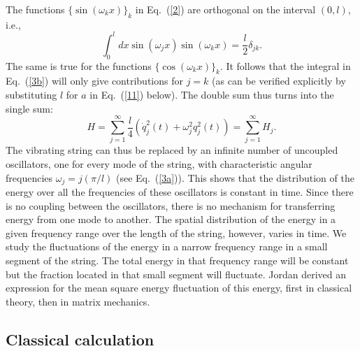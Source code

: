 \documentclass[12pt]{elsart}
\begin{document}
The functions $\{ \sin{(\omega_k x)} \}_k$ in  Eq.\ (\ref{2}) are orthogonal on the interval $(0, l)$, i.e.,
\begin{equation}
\int_0^l dx   \sin{(\omega_j x)}  \sin{(\omega_k x)}  =  \frac{l}{2} \delta_{jk}.
\label{3c}
\end{equation}
The same is true for the functions $\{ \cos{(\omega_k x)} \}_k$. It follows that the integral in Eq.\ (\ref{3b}) will only give contributions for $j = k$ (as can be verified explicitly by substituting $l$ for $a$ in Eq.\ (\ref{11}) below). The double sum thus turns into the single sum:
\begin{equation}
H  = \sum_{j=1}^\infty \frac{l}{4} \left(  \dot{q}_j^2(t) + \omega_j^2 q_j^2(t)  \right) = \sum_{j=1}^\infty H_j.
\label{4}
\end{equation}
The vibrating string can thus be replaced by an infinite number of uncoupled oscillators, one for every mode of the string, with characteristic angular frequencies $\omega_j = j (\pi/l)$ (see Eq.\ (\ref{3a})). This shows that the distribution of the energy over all the frequencies of these oscillators is constant in time. Since there is no coupling between the oscillators, there is no mechanism for transferring energy from one mode to another. The spatial distribution of the energy in a given frequency range over the length of the string, however, varies in time. We study the fluctuations of the energy in a narrow frequency range in a small segment of the string. The total energy in that frequency range will be constant but the fraction located in that small segment will fluctuate. Jordan derived an expression for the mean square energy fluctuation of this energy, first in classical theory, then in matrix mechanics.

\subsection{Classical calculation}
\end{document}
